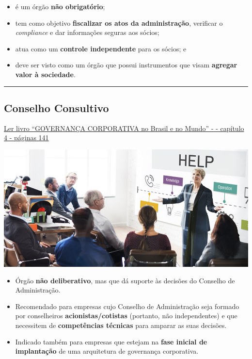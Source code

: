 \documentclass[
]{book}
\providecommand{\tightlist}{%
  \setlength{\itemsep}{0pt}\setlength{\parskip}{0pt}}
\begin{document}
\begin{itemize}
\tightlist
\item
  é um órgão \textbf{não obrigatório};
\item
  tem como objetivo \textbf{fiscalizar os atos da administração}, verificar o \emph{compliance} e dar informações seguras aos sócios;
\item
  atua como um \textbf{controle independente} para os sócios; e
\item
  deve ser visto como um órgão que possui instrumentos que visam \textbf{agregar valor à sociedade}.
\end{itemize}

\begin{center}\rule{0.5\linewidth}{0.5pt}\end{center}

\subsection{Conselho Consultivo}\label{conselho-consultivo}

\href{https://pdfcoffee.com/governana-corporativa-no-brasil-e-no-mundo-pdf-free.html}{Ler livro ``GOVERNANÇA CORPORATIVA no Brasil e no Mundo'' - - capítulo 4 - páginas 141}

\includegraphics[width=8.30208in,height=\textheight]{images/04-2025-08-26_27/03-conselho_consultivo.jpg}

\begin{itemize}
\tightlist
\item
  Órgão \textbf{não deliberativo}, mas que dá suporte às decisões do Conselho de Administração.
\item
  Recomendado para empresas cujo Conselho de Administração seja formado por conselheiros \textbf{acionistas/cotistas} (portanto, não independentes) e que necessitem de \textbf{competências técnicas} para amparar as suas decisões.
\item
  Indicado também para empresas que estejam na \textbf{fase inicial de implantação} de uma arquitetura de governança corporativa.
\end{itemize}
\end{document}

